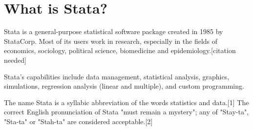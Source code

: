 


\section{What is Stata?}
Stata is a general-purpose statistical software package created in 1985 by StataCorp. Most of its users work in research, especially in the fields of economics, sociology, political science, biomedicine and epidemiology.[citation needed]
 
Stata's capabilities include data management, statistical analysis, graphics, simulations, regression analysis (linear and multiple), and custom programming.
 
The name Stata is a syllabic abbreviation of the words statistics and data.[1] The correct English pronunciation of Stata "must remain a mystery"; any of "Stay-ta", "Sta-ta" or "Stah-ta" are considered acceptable.[2]



